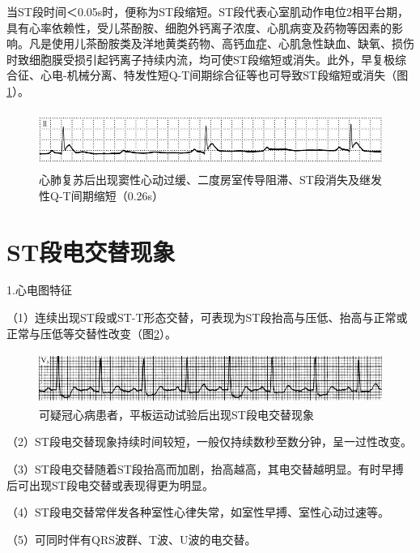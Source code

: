 当ST段时间＜0.05s时，便称为ST段缩短。ST段代表心室肌动作电位2相平台期，具有心率依赖性，受儿茶酚胺、细胞外钙离子浓度、心肌病变及药物等因素的影响。凡是使用儿茶酚胺类及洋地黄类药物、高钙血症、心肌急性缺血、缺氧、损伤时致细胞膜受损引起钙离子持续内流，均可使ST段缩短或消失。此外，早复极综合征、心电-机械分离、特发性短Q-T间期综合征等也可导致ST段缩短或消失（图\ref{fig5-9}）。

\begin{figure}[!htbp]
 \centering
 \includegraphics[width=5.64583in,height=0.73958in]{./images/Image00090.jpg}
 \captionsetup{justification=centering}
 \caption{心肺复苏后出现窦性心动过缓、二度房室传导阻滞、ST段消失及继发性Q-T间期缩短（0.26s）}
 \label{fig5-9}
  \end{figure} 

\protect\hypertarget{text00011.htmlux5cux23subid83}{}{}

\section{ST段电交替现象}

1.心电图特征

（1）连续出现ST段或ST-T形态交替，可表现为ST段抬高与压低、抬高与正常或正常与压低等交替性改变（图\ref{fig5-10}）。

\begin{figure}[!htbp]
 \centering
 \includegraphics[width=5.07292in,height=0.64583in]{./images/Image00091.jpg}
 \captionsetup{justification=centering}
 \caption{可疑冠心病患者，平板运动试验后出现ST段电交替现象}
 \label{fig5-10}
  \end{figure} 

（2）ST段电交替现象持续时间较短，一般仅持续数秒至数分钟，呈一过性改变。

（3）ST段电交替随着ST段抬高而加剧，抬高越高，其电交替越明显。有时早搏后可出现ST段电交替或表现得更为明显。

（4）ST段电交替常伴发各种室性心律失常，如室性早搏、室性心动过速等。

（5）可同时伴有QRS波群、T波、U波的电交替。

